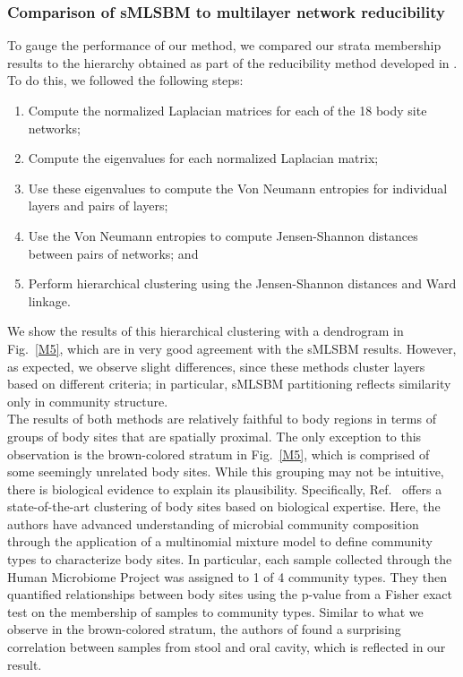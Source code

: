 \subsubsection{Comparison of sMLSBM to multilayer network reducibility}
To gauge the performance of our method, we compared our strata membership results to the hierarchy obtained as part of the reducibility method developed in \cite{domen}. To do this, we followed the following steps: 
\begin{enumerate}
\item Compute the normalized Laplacian matrices for each of the 18 body site networks;
\item Compute the eigenvalues for each normalized Laplacian matrix;
\item Use these eigenvalues to compute the Von Neumann entropies for individual layers and pairs of layers;
\item Use the Von Neumann entropies to compute Jensen-Shannon distances between pairs of networks; and
\item Perform hierarchical clustering using the Jensen-Shannon distances and Ward linkage. 
\end{enumerate}
We show the results of this hierarchical clustering with a dendrogram in Fig.~\ref{M5}, which are 
%
in very good agreement with the sMLSBM results. However, as expected, we observe slight differences, since these methods cluster layers based on different criteria; in particular, sMLSBM partitioning reflects similarity only in community structure. \\
%
\indent The results of both methods are relatively faithful to body regions in terms of groups of body sites that are spatially proximal. The only exception to this observation is the brown-colored stratum in Fig.~\ref{M5}, which is comprised of some seemingly unrelated body sites. While this grouping may not be intuitive, there is biological evidence to explain its plausibility. Specifically, Ref.~\cite{dingcluster} offers a state-of-the-art clustering of body sites based on biological expertise. Here, the authors have advanced understanding of microbial community composition through the application of a multinomial mixture model to define community types to characterize body sites. In particular, each sample collected through the Human Microbiome Project was assigned to 1 of 4 community types. They then quantified relationships between body sites using the p-value from a Fisher exact test on the membership of samples to community types. Similar to what we observe  in the brown-colored stratum, the authors of \cite{dingcluster} found a surprising correlation between samples from stool and oral cavity, which is reflected in our result. 


